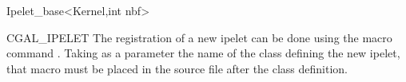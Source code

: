 \begin{ccRefClass}{Ipelet_base<Kernel,int nbf>}

\end{ccRefClass}
\begin{ccRefMacro}{CGAL_IPELET}
The registration of a new ipelet can be done using the macro command .
Taking as a parameter the name of the class defining the new ipelet, that macro must be placed in the source
file after the class definition. 
\end{ccRefMacro}

